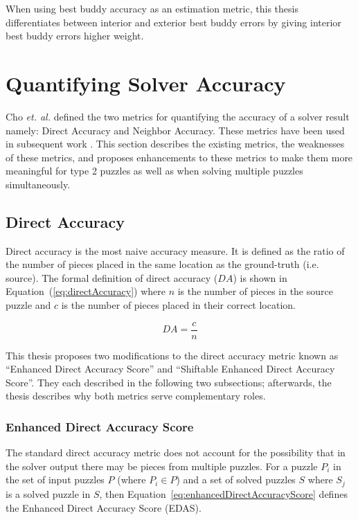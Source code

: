 \documentclass{report}
\def\eref#1{(\ref{#1})}
\begin{document}
When using best buddy accuracy as an estimation metric, this thesis differentiates between interior and exterior best buddy errors by giving interior best buddy errors higher weight.

\pagebreak
\section{Quantifying Solver Accuracy}\label{sec:quantifyingSolverAccuracy}

Cho \textit{et. al.} \cite{cho2010} defined the two metrics for quantifying the accuracy of a solver result namely: Direct Accuracy and Neighbor Accuracy. These metrics have been used in subsequent work \cite{sholomon2013, pomeranz2011, paikin2015, son2014, gallagher2012}.  This section describes the existing metrics, the weaknesses of these metrics, and proposes enhancements to these metrics to make them more meaningful for type 2 puzzles as well as when solving multiple puzzles simultaneously.

\subsection{Direct Accuracy}\label{sec:directAccuracy}

Direct accuracy is the most naive accuracy measure.  It is defined as the ratio of the number of pieces placed in the same location as the ground-truth (i.e. source).  The formal definition of direct accuracy ($DA$) is shown in Equation~\eref{eq:directAccuracy} where $n$ is the number of pieces in the source puzzle and $c$ is the number of pieces placed in their correct location.

\begin{equation} \label{eq:directAccuracy}
DA = \frac{c}{n}
\end{equation}

This thesis proposes two modifications to the direct accuracy metric known as ``Enhanced Direct Accuracy Score'' and ``Shiftable Enhanced Direct Accuracy Score''.  They each described in the following two subsections; afterwards, the thesis describes why both metrics serve complementary roles.

\subsubsection{Enhanced Direct Accuracy Score}\label{sec:enhancedDirectAccuracyScore}

The standard direct accuracy metric does not account for the possibility that in the solver output there may be pieces from multiple puzzles.  For a puzzle $P_i$ in the set of input puzzles $P$ (where $P_i \in P$) and a set of solved puzzles $S$ where $S_j$ is a solved puzzle in $S$, then Equation~\ref{eq:enhancedDirectAccuracyScore} defines the Enhanced Direct Accuracy Score (EDAS).
\end{document}
